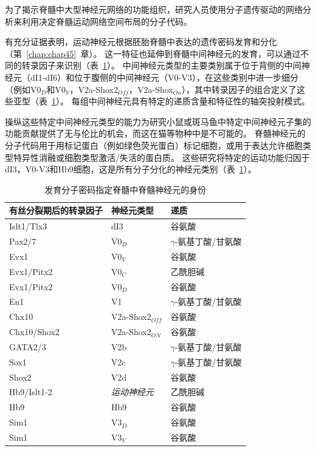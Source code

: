 \begin{proposition} \label{box:33_3}
	
	\quad \quad 为了揭示脊髓中大型神经元网络的功能组织，研究人员使用分子遗传驱动的网络分析来利用决定脊髓运动网络空间布局的分子代码。
	
	\quad \quad 有充分证据表明，运动神经元根据胚胎脊髓中表达的遗传密码发育和分化（第~\ref{chap:chap45}~章）。
	这一特征也延伸到脊髓中间神经元的发育，可以通过不同的转录因子来识别（表~\ref{tab:33_1}）。
	中间神经元类型的主要类别属于位于背侧的中间神经元（dI1-dI6）和位于腹侧的中间神经元（V0-V3），在这些类别中进一步细分（例如V0$_D$和V0$_V$，V2a-Shox2$_{Off}$，V2a-Shox$_{On}$），其中转录因子的组合定义了这些亚型（表~\ref{tab:33_1}）。
	每组中间神经元具有特定的递质含量和特征性的轴突投射模式。
	
	\quad \quad 操纵这些特定中间神经元类型的能力为研究小鼠或斑马鱼中特定中间神经元子集的功能贡献提供了无与伦比的机会，而这在猫等物种中是不可能的。
	脊髓神经元的分子代码用于用标记蛋白（例如绿色荧光蛋白）标记细胞，或用于表达允许细胞类型特异性消融或细胞类型激活/失活的蛋白质。
	这些研究将特定的运动功能归因于dI3，V0-V3和Hb9细胞，这是所有分子分化的神经元类别（表~\ref{tab:33_1}）。
	
\end{proposition}


\begin{table}[htbp]
	\caption{发育分子密码指定脊髓中脊髓神经元的身份} \label{tab:33_1} \centering
	\begin{tabular}{lll}
		\toprule
		有丝分裂期后的转录因子 & 神经元类型 & 递质 \\
		\midrule
		Islt1/Tlx3 & dI3 & 谷氨酸  \\
		Pax2/7 & V0$_D$ & $\gamma$-氨基丁酸/甘氨酸  \\
		Evx1 & V0$_V$ & 谷氨酸  \\
		Evx1/Pitx2 & V0$_C$ & 乙酰胆碱  \\
		Evx1/Pitx2 & V0$_D$ & 谷氨酸  \\
		En1 & V1 & $\gamma$-氨基丁酸/甘氨酸  \\
		Chx10 & V2a-Shox2$_{Off}$ & 谷氨酸  \\
		Chx10/Shox2 & V2a-Shox2$_{ON}$ & 谷氨酸  \\
		GATA2/3 & V2b & $\gamma$-氨基丁酸/甘氨酸  \\
		Sox1 & V2c & $\gamma$-氨基丁酸/甘氨酸  \\
		Shox2 & V2d & 谷氨酸  \\
		Hb9/Islt1-2 & \textit{运动神经元} & 乙酰胆碱  \\
		Hb9 & Hb9 & 谷氨酸  \\
		Sim1 & V3$_D$ & 谷氨酸  \\
		Sim1 & V3$_V$ & 谷氨酸  \\
		\bottomrule
	\end{tabular}
\end{table}


